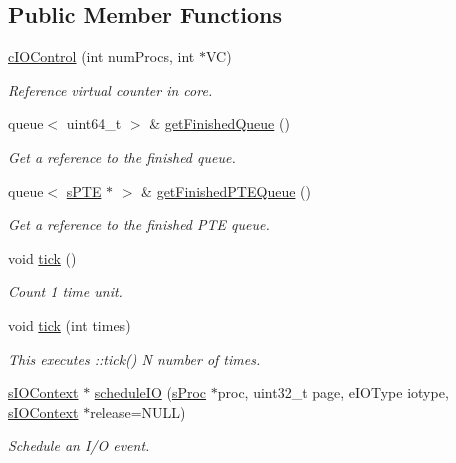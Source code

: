 \subsection*{\-Public \-Member \-Functions}
\begin{DoxyCompactItemize}
\item 
\hypertarget{classcIOControl_aefe59221a4ffc9df0973e468febf013b}{\hyperlink{classcIOControl_aefe59221a4ffc9df0973e468febf013b}{c\-I\-O\-Control} (int num\-Procs, int $\ast$\-V\-C)}\label{da/d8f/classcIOControl_aefe59221a4ffc9df0973e468febf013b}

\begin{DoxyCompactList}\small\item\em \-Reference virtual counter in core. \end{DoxyCompactList}\item 
queue$<$ uint64\-\_\-t $>$ \& \hyperlink{classcIOControl_a7765e006a0403642713469f9674a1dd3}{get\-Finished\-Queue} ()
\begin{DoxyCompactList}\small\item\em \-Get a reference to the finished queue. \end{DoxyCompactList}\item 
queue$<$ \hyperlink{structsPTE}{s\-P\-T\-E} $\ast$ $>$ \& \hyperlink{classcIOControl_a72bbe2fda30108727eab840aede31b42}{get\-Finished\-P\-T\-E\-Queue} ()
\begin{DoxyCompactList}\small\item\em \-Get a reference to the finished \-P\-T\-E queue. \end{DoxyCompactList}\item 
void \hyperlink{classcIOControl_a820f361e69d99d0da35ebf448643d54a}{tick} ()
\begin{DoxyCompactList}\small\item\em \-Count 1 time unit. \end{DoxyCompactList}\item 
void \hyperlink{classcIOControl_a85b87b93a0b52ba7aa5c3b764f58903d}{tick} (int times)
\begin{DoxyCompactList}\small\item\em \-This executes \-::tick() \-N number of times. \end{DoxyCompactList}\item 
\hyperlink{structsIOContext}{s\-I\-O\-Context} $\ast$ \hyperlink{classcIOControl_a47ac21dd888187a969eec853b7256a83}{schedule\-I\-O} (\hyperlink{structsProc}{s\-Proc} $\ast$proc, uint32\-\_\-t page, e\-I\-O\-Type iotype, \hyperlink{structsIOContext}{s\-I\-O\-Context} $\ast$release=\-N\-U\-L\-L)
\begin{DoxyCompactList}\small\item\em \-Schedule an \-I/\-O event. \end{DoxyCompactList}\end{DoxyCompactItemize}

